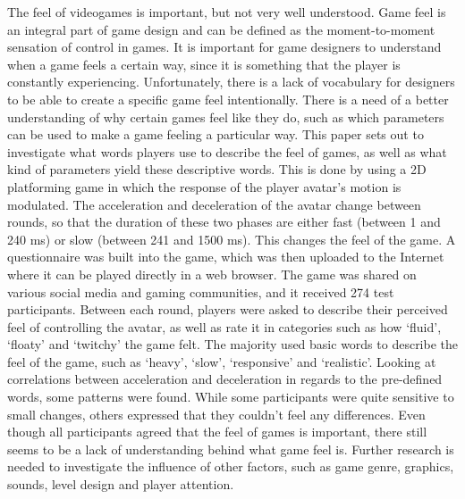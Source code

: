 The feel of videogames is important, but not very well understood. Game feel is an integral part of game design and can be defined as the moment-to-moment sensation of control in games. It is important for game designers to understand when a game feels a certain way, since it is something that the player is constantly experiencing. Unfortunately, there is a lack of vocabulary for designers to be able to create a specific game feel intentionally. There is a need of a better understanding of why certain games feel like they do, such as which parameters can be used to make a game feeling a particular way. This paper sets out to investigate what words players use to describe the feel of games, as well as what kind of parameters yield these descriptive words. This is done by using a 2D platforming game in which the response of the player avatar's motion is modulated. The acceleration and deceleration of the avatar change between rounds, so that the duration of these two phases are either fast (between 1 and 240 ms) or slow (between 241 and 1500 ms). This changes the feel of the game. A questionnaire was built into the game, which was then uploaded to the Internet where it can be played directly in a web browser. The game was shared on various social media and gaming communities, and it received 274 test participants. Between each round, players were asked to describe their perceived feel of controlling the avatar, as well as rate it in categories such as how `fluid', `floaty' and `twitchy' the game felt. The majority used basic words to describe the feel of the game,  such as `heavy', `slow', `responsive' and `realistic'. Looking at correlations between acceleration and deceleration in regards to the pre-defined words, some patterns were found. While some participants were quite sensitive to small changes, others expressed that they couldn't feel any differences. Even though all participants agreed that the feel of games is important, there still seems to be a lack of understanding behind what game feel is. Further research is needed to investigate the influence of other factors, such as game genre, graphics, sounds, level design and player attention.
